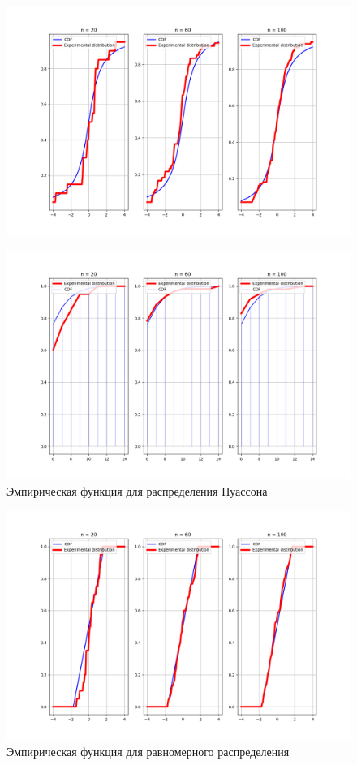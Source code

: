 \documentclass[a4]{article}
\begin{document}
\begin{center}
\begin{figure}[H]
	\includegraphics[width=\textwidth]{cauchy_cdf.png}
\end{figure}
 \begin{figure}[H]
	\caption{Эмпирическая функция для распределения Пуассона}
	\includegraphics[width=\textwidth]{poisson_cdf.png}
\end{figure}
 \begin{figure}[H]
	\caption{Эмпирическая функция для равномерного распределения}
	\includegraphics[width=\textwidth]{uniform_cdf.png}
\end{figure}
\end{center}
\end{document}
